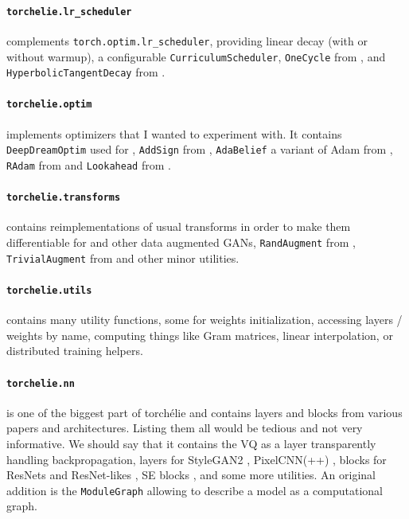 \paragraph{\texttt{torchelie.lr\_scheduler}} complements \texttt{torch.optim.lr\_scheduler}, providing linear decay \cite{lineardecay} (with or without warmup), a configurable \texttt{CurriculumScheduler}, \texttt{OneCycle} from \citet{1cycle}, and \texttt{HyperbolicTangentDecay} from \citet{htd}.

\paragraph{\texttt{torchelie.optim}} implements optimizers that I wanted to experiment with. It contains \texttt{DeepDreamOptim} used for \citet{deepdream,deepdreamtuto}, \texttt{AddSign} from \citet{addsign}, \texttt{AdaBelief} a variant of Adam from \citet{adabelief}, \texttt{RAdam} from \citet{radam} and \texttt{Lookahead} from \citet{lookahead}.

\paragraph{\texttt{torchelie.transforms}} contains reimplementations of usual transforms in order to make them differentiable for \citet{stylegan2} and other data augmented \acp{GAN}, \texttt{RandAugment} from \citet{randaugment}, \texttt{TrivialAugment} from \citet{trivialaugment} and other minor utilities.


\paragraph{\texttt{torchelie.utils}} contains many utility functions, some for weights initialization, accessing layers / weights by name, computing things like Gram matrices, linear interpolation, or distributed training helpers. 

\paragraph{\texttt{torchelie.nn}} is one of the biggest part of torchélie and contains layers and blocks from various papers and architectures. Listing them all would be tedious and not very informative. We should say that it contains the \ac{VQ} as a layer transparently handling backpropagation, layers for StyleGAN2 \cite{stylegan2}, PixelCNN(++) \cite{pixelcnn,pixelcnn++}, blocks for ResNets and ResNet-likes \cite{resnet,resnext}, SE blocks \cite{squeezeexcitation}, and some more utilities. An original addition is the \texttt{ModuleGraph} allowing to describe a model as a computational graph.

